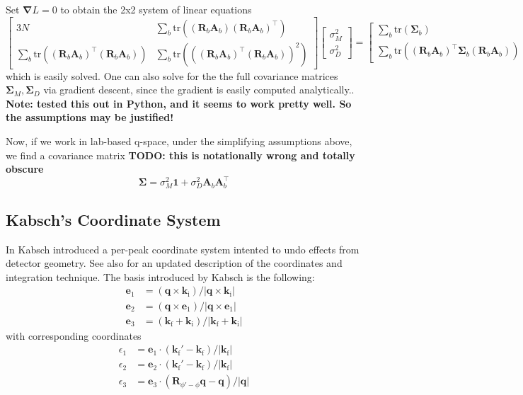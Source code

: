 \documentclass[11pt,a4paper]{article}
\def\v#1{\bm{{#1}}}
\def\tr{^\intercal}
\def\si{\text{i}}
\def\sf{\text{f}}
\def\be{{\v{e}}}
\def\k{{\v{k}}}
\def\q{{\v{q}}}
\def\trace{\mathrm{tr}}
\begin{document}
Set $\v\nabla L = 0$ to obtain the 2x2 system of linear equations
\begin{equation}
  \begin{bmatrix}
    3N & \sum_b \trace( (\v{R}_b\v{A}_b)(\v{R}_b \v{A}_b)\tr) \\
    \sum_b \trace((\v{R}_b\v{A}_b)\tr(\v{R}_b \v{A}_b)) & \sum_b \trace(((\v{R}_b \v{A}_b)\tr(\v{R}_b\v{A}_b))^2)
  \end{bmatrix}
  \begin{bmatrix}
    \sigma_M^2 \\
    \sigma_D^2
  \end{bmatrix}
  =
  \begin{bmatrix}
    \sum_b \trace(\v\Sigma_b) \\
    \sum_b \trace((\v{R}_b \v{A}_b)\tr \v\Sigma_b (\v{R}_b \v{A}_b))
  \end{bmatrix},
\end{equation}
which is easily solved.
One can also solve for the the full covariance matrices $\v\Sigma_M, \v\Sigma_D$
via gradient descent, since the gradient is easily computed analytically..
\textbf{Note: tested this out in Python, and it seems to work pretty well.
So the assumptions may be justified!}

Now, if we work in lab-based q-space, under the simplifying assumptions above,
we find a covariance matrix
\textbf{TODO: this is notationally wrong and totally obscure}
\begin{equation} \v\Sigma = \sigma_M^2 \v1 + \sigma_D^2 \v{A}_b \v{A}_b\tr \end{equation}


\subsection{Kabsch's Coordinate System}

In \cite{Kab88b} Kabsch introduced a per-peak coordinate system intented to undo effects from detector geometry.
See also \cite{Kab10b} for an updated description of the coordinates and integration technique.
The basis introduced by Kabsch is the following:
\begin{align}
  \be_1 &= (\q \times \k_\si) / |\q \times \k_\si| \\
  \be_2 &= (\q \times \be_1) / |\q \times \be_1| \\
  \be_3 &= (\k_\sf + \k_\si) / |\k_\sf + \k_\si|
\end{align}
with corresponding coordinates
\begin{align}
  \epsilon_1 &= \be_1 \cdot (\k_\sf'-\k_\sf) / |\k_\sf| \\
  \epsilon_2 &= \be_2 \cdot (\k_\sf'-\k_\sf) / |\k_\sf| \\
  \epsilon_3 &= \be_3 \cdot (\v{R}_{\phi'-\phi}\q-\q) / |\q|
\end{align}
\end{document}
